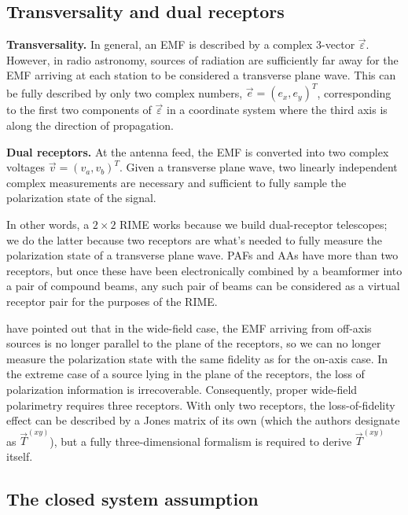 \documentclass{aa}
\newcommand{\jones}[2]{\vec {#1}_{#2}}
\begin{document}
\subsection{Transversality and dual receptors}

{\bf Transversality.} In general, an EMF is described by a complex 3-vector $\vec\varepsilon$. However, in radio astronomy, sources of radiation are sufficiently far away for the EMF arriving at each station to be considered a transverse plane wave. This can be fully described by only two complex numbers, $\vec e=(e_x,e_y)^T$, corresponding to the first two components of $\vec\varepsilon$ in a coordinate system where the third axis is along the direction of propagation.

{\bf Dual receptors.} At the antenna feed, the EMF is converted into two complex voltages $\vec v=(v_a,v_b)^T$. Given a transverse plane wave, two linearly independent complex measurements are necessary and sufficient to fully sample the polarization state of the signal. 

In other words, a $2\times2$ RIME works because we build dual-receptor telescopes; we do the latter because two receptors are what's needed to fully measure the polarization state of a transverse plane wave. PAFs and AAs have more than two receptors, but once these have been electronically combined by a beamformer into a pair of compound beams, any such pair of beams can be considered as a virtual receptor pair for the purposes of the RIME.

\citet{Carozzi:ME3D} have pointed out that in the wide-field case, the EMF arriving from off-axis sources is no longer parallel to the plane of the receptors, so we can no longer measure the polarization state with the same fidelity as for the on-axis case. In the extreme case of a source lying in the plane of the receptors, the loss of polarization information is irrecoverable. Consequently, proper wide-field polarimetry requires three receptors. With only two receptors, the loss-of-fidelity effect can be described by a Jones matrix of its own (which the authors designate as $\jones{T}{}^{(xy)}$), but a fully three-dimensional formalism is required to derive $\jones{T}{}^{(xy)}$ itself.

\subsection{The closed system assumption}
\label{sec:closed-sys-assumption}
\end{document}
